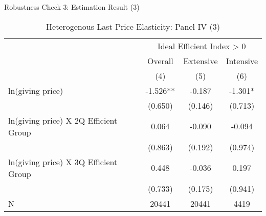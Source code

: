 \documentclass[
  ignorenonframetext,
]{beamer}
\begin{document}
\begin{frame}{Robustness Check 3: Estimation Result (3)}
\protect\hypertarget{robustness-check-3-estimation-result-3}{}
\begin{table}

\caption{\label{tab:kableHeteroShortElasticitySlide3}Heterogenous Last Price Elasticity: Panel IV (3)}
\centering
\fontsize{8}{10}\selectfont
\begin{tabular}[t]{lccc}
\toprule
\multicolumn{1}{c}{ } & \multicolumn{3}{c}{Ideal Efficient Index > 0} \\
\cmidrule(l{3pt}r{3pt}){2-4}
\multicolumn{1}{c}{ } & \multicolumn{1}{c}{Overall} & \multicolumn{1}{c}{Extensive} & \multicolumn{1}{c}{Intensive} \\
\cmidrule(l{3pt}r{3pt}){2-2} \cmidrule(l{3pt}r{3pt}){3-3} \cmidrule(l{3pt}r{3pt}){4-4}
 & (4) & (5) & (6)\\
\midrule
ln(giving price) & -1.526** & -0.187 & -1.301*\\
 & (0.650) & (0.146) & (0.713)\\
ln(giving price) X 2Q Efficient Group & 0.064 & -0.090 & -0.094\\
 & (0.863) & (0.192) & (0.974)\\
ln(giving price) X 3Q Efficient Group & 0.448 & -0.036 & 0.197\\
 & (0.733) & (0.175) & (0.941)\\
N & 20441 & 20441 & 4419\\
\bottomrule
\end{tabular}
\end{table}
\end{frame}
\end{document}
